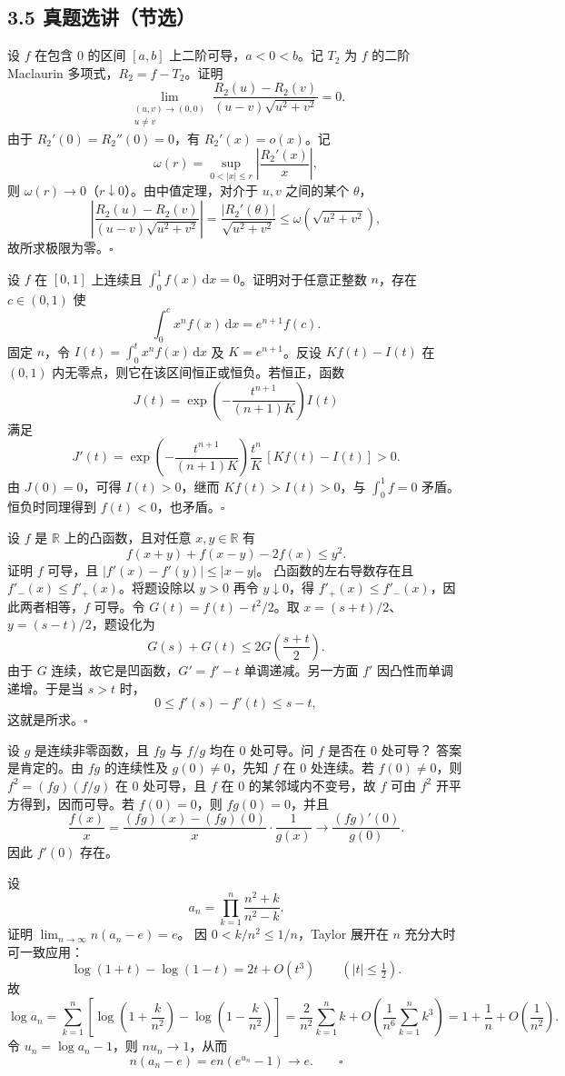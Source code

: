 \subsection*{3.5 真题选讲（节选）}

设 $f$ 在包含 $0$ 的区间 $[a,b]$ 上二阶可导，$a<0<b$。记 $T_2$ 为 $f$ 的二阶 Maclaurin 多项式，$R_2=f-T_2$。证明
\[
\lim_{\substack{(u,v)\to(0,0)\\u\ne v}}
\frac{R_2(u)-R_2(v)}{(u-v)\sqrt{u^2+v^2}}=0.
\]
\pf 由于 $R_2'(0)=R_2''(0)=0$，有 $R_2'(x)=o(x)$。记
\[
\omega(r)=\sup_{0<|x|\leq r}\left|\frac{R_2'(x)}{x}\right|,
\]
则 $\omega(r)\to0$（$r\downarrow0$）。由中值定理，对介于 $u,v$ 之间的某个 $\theta$，
\[
\left|\frac{R_2(u)-R_2(v)}{(u-v)\sqrt{u^2+v^2}}\right|
=\frac{|R_2'(\theta)|}{\sqrt{u^2+v^2}}
\leq\omega\!\left(\sqrt{u^2+v^2}\right),
\]
故所求极限为零。\hfill$\square$

设 $f$ 在 $[0,1]$ 上连续且 $\int_0^1 f(x)\,\mathrm dx=0$。证明对于任意正整数 $n$，存在 $c\in(0,1)$ 使
\[
\int_0^c x^n f(x)\,\mathrm dx=e^{n+1}f(c).
\]
\pf 固定 $n$，令 $I(t)=\int_0^t x^nf(x)\,\mathrm dx$ 及 $K=e^{n+1}$。反设 $Kf(t)-I(t)$ 在 $(0,1)$ 内无零点，则它在该区间恒正或恒负。若恒正，函数
\[
J(t)=\exp\!\left(-\frac{t^{n+1}}{(n+1)K}\right)I(t)
\]
满足
\[
J'(t)=\exp\!\left(-\frac{t^{n+1}}{(n+1)K}\right)
\frac{t^n}{K}\,[Kf(t)-I(t)]>0.
\]
由 $J(0)=0$，可得 $I(t)>0$，继而 $Kf(t)>I(t)>0$，与 $\int_0^1 f=0$ 矛盾。恒负时同理得到 $f(t)<0$，也矛盾。\hfill$\square$

设 $f$ 是 $\mathbb R$ 上的凸函数，且对任意 $x,y\in\mathbb R$ 有
\[
f(x+y)+f(x-y)-2f(x)\leq y^2.
\]
证明 $f$ 可导，且 $|f'(x)-f'(y)|\leq|x-y|$。
\pf 凸函数的左右导数存在且 $f'_-(x)\leq f'_+(x)$。将题设除以 $y>0$ 再令 $y\downarrow0$，得 $f'_+(x)\leq f'_-(x)$，因此两者相等，$f$ 可导。令 $G(t)=f(t)-t^2/2$。取 $x=(s+t)/2$、$y=(s-t)/2$，题设化为
\[
G(s)+G(t)\leq2G\!\left(\frac{s+t}{2}\right).
\]
由于 $G$ 连续，故它是凹函数，$G'=f'-t$ 单调递减。另一方面 $f'$ 因凸性而单调递增。于是当 $s>t$ 时，
\[
0\leq f'(s)-f'(t)\leq s-t,
\]
这就是所求。\hfill$\square$

设 $g$ 是连续非零函数，且 $fg$ 与 $f/g$ 均在 $0$ 处可导。问 $f$ 是否在 $0$ 处可导？
\sol 答案是肯定的。由 $fg$ 的连续性及 $g(0)\ne0$，先知 $f$ 在 $0$ 处连续。若 $f(0)\ne0$，则 $f^2=(fg)(f/g)$ 在 $0$ 处可导，且 $f$ 在 $0$ 的某邻域内不变号，故 $f$ 可由 $f^2$ 开平方得到，因而可导。若 $f(0)=0$，则 $fg(0)=0$，并且
\[
\frac{f(x)}x=\frac{(fg)(x)-(fg)(0)}x\cdot\frac1{g(x)}
\longrightarrow\frac{(fg)'(0)}{g(0)}.
\]
因此 $f'(0)$ 存在。

设
\[
a_n=\prod_{k=1}^{n}\frac{n^2+k}{n^2-k}.
\]
证明 $\lim_{n\to\infty}n(a_n-e)=e$。
\pf 因 $0<k/n^2\leq1/n$，Taylor 展开在 $n$ 充分大时可一致应用：
\[
\log(1+t)-\log(1-t)=2t+O(t^3)\qquad(|t|\leq\tfrac12).
\]
故
\[
\log a_n
=\sum_{k=1}^n\left[\log\left(1+\frac{k}{n^2}\right)
-\log\left(1-\frac{k}{n^2}\right)\right]
=\frac{2}{n^2}\sum_{k=1}^n k
+O\!\left(\frac1{n^6}\sum_{k=1}^n k^3\right)
=1+\frac1n+O\!\left(\frac1{n^2}\right).
\]
令 $u_n=\log a_n-1$，则 $nu_n\to1$，从而
\[
n(a_n-e)=en(e^{u_n}-1)\longrightarrow e.\qquad\square
\]
